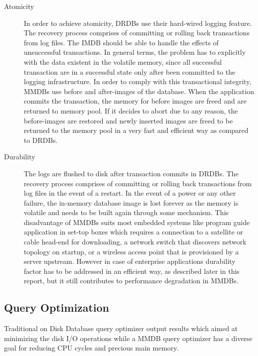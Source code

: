 \documentclass[12pt]{article} %
\begin{document}
\begin{description}
\item[Atomicity] In order to achieve atomicity, DRDBs use their hard-wired logging feature. The recovery process comprises of committing or rolling back transactions from log files. The IMDB should be able to handle the effects of unsuccessful transactions. In general terms, the problem has to explicitly with the data existent in the volatile memory, since all successful transaction are in a successful state only after been committed to the logging infrastructure. In order to comply with this transactional integrity, MMDBs use before and after-images of the database. When the application commits the transaction, the memory for before images are freed and are returned to memory pool. If it decides to abort due to any reason, the before-images are restored and newly inserted images are freed to be returned to the memory pool in a very fast and efficient way as compared to DRDBs.

\item[Durability] The logs are flushed to disk after transaction commits in DRDBs. The recovery process comprises of committing or rolling back transactions from log files in the event of a restart. In the event of a power or any other failure, the in-memory database image is lost forever as the memory is volatile and needs to be built again through some mechanism. This disadvantage of MMDBs suits most embedded systems like program guide application in set-top boxes which requires a connection to a satellite or cable head-end for downloading, a network switch that discovers network topology on startup, or a wireless access point that is provisioned by a server upstream. However in case of enterprise applications durability factor has to be addressed in an efficient way, as described later in this report, but it still contributes to performance degradation in MMDBs.
\end{description}

\subsection{Query Optimization}
Traditional on Disk Database query optimizer output results which aimed at minimizing the disk I/O operations while a MMDB query optimizer has a diverse goal for reducing CPU cycles and precious main memory. 




\end{document}
